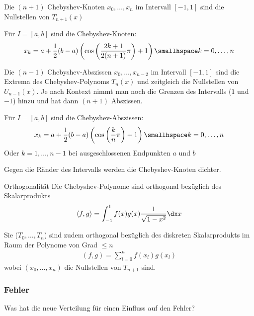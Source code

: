  Die $(n + 1)$ Chebyshev-Knoten $x_0, \ldots, x_n$ im Intervall $[-1, 1]$ sind die Nullstellen von $T_{n + 1}(x)$

 Für $I = [a, b]$ sind die Chebyshev-Knoten:
\rmvspace
\begin{align*}
	x_k = a + \frac{1}{2} (b - a) \left( \cos \left( \frac{2k + 1}{2(n + 1)} \pi \right) + 1 \right) \smallhspace k = 0, \ldots, n
\end{align*}

 Die $(n - 1)$ Chebyshev-Abszissen $x_0, \ldots, x_{n - 2}$ im Intervall $[-1, 1]$ sind die Extrema des Chebyshev-Polynoms $T_n(x)$ und zeitgleich die Nullstellen von $U_{n - 1}(x)$.
Je nach Kontext nimmt man noch die Grenzen des Intervalls ($1$ und $-1$) hinzu und hat dann $(n + 1)$ Abszissen.

 Für $I = [a, b]$ sind die Chebyshev-Abszissen:
\rmvspace
\begin{align*}
	x_k = a + \frac{1}{2} (b - a) \left( \cos \left( \frac{k}{n} \pi \right) + 1 \right) \smallhspace k = 0, \ldots, n
\end{align*}
Oder $k = 1, \ldots, n - 1$ bei ausgeschlossenen Endpunkten $a$ und $b$

\inlineremark Gegen die Ränder des Intervalls werden die Chebyshev-Knoten dichter.

\begin{theorem}[]{Orthogonalität}
	Die Chebyshev-Polynome sind orthogonal bezüglich des Skalarprodukts
	\rmvspace
	\begin{align*}
		\langle f, g \rangle = \int_{-1}^{1} f(x) g(x) \frac{1}{\sqrt{1 - x^2}} \dx x
	\end{align*}

	Sie ($T_0, \ldots, T_n$) sind zudem orthogonal bezüglich des diskreten Skalarprodukts im Raum der Polynome von Grad $\leq n$
	\rmvspace
	\begin{align*}
		(f, g) = \sum_{l = 0}^{n} f(x_l)g(x_l)
	\end{align*}
	wobei $(x_0, \ldots, x_n)$ die Nullstellen von $T_{n + 1}$ sind.
\end{theorem}


\newpage
\subsubsection{Fehler}
Was hat die neue Verteilung für einen Einfluss auf den Fehler?

